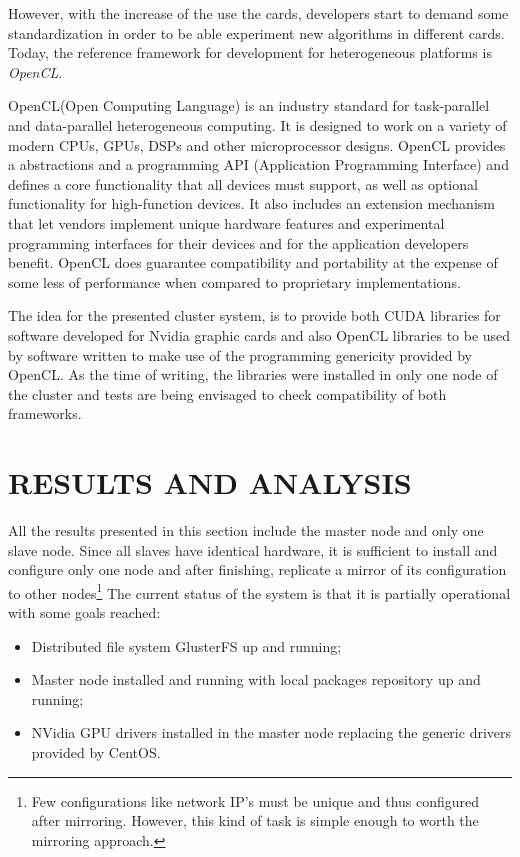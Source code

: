 \documentclass[twoside,a4paper,12pt,english]{inac17}
\begin{document}
However, with the increase of the use the cards, developers start to demand some
standardization in order to be able experiment new algorithms in different cards. Today, the
reference framework for development for heterogeneous platforms is \textit{OpenCL}\cite{opencl}.

OpenCL\texttrademark (Open Computing Language) is an industry standard for task-parallel and
data-parallel heterogeneous computing. It is designed to work on a variety of modern
CPUs, GPUs, DSPs and other microprocessor designs. OpenCL provides a abstractions and a
programming API (Application Programming Interface) and defines a core functionality that all
devices must support, as well as optional functionality for high-function devices. It also
includes an extension mechanism that let vendors implement unique hardware features and
experimental programming interfaces for their devices and for the application developers
benefit. OpenCL does guarantee compatibility and portability at the expense of some less
of performance when compared to proprietary implementations.

The idea for the presented cluster system, is to provide both CUDA libraries for
software developed for Nvidia graphic cards and also OpenCL libraries to
be used by software written to make use of the programming genericity
provided by OpenCL. As the time of writing, the libraries were installed
in only one node of the cluster and tests are being envisaged to check
compatibility of both frameworks.


\section{RESULTS AND ANALYSIS}

All the results presented in this section include the master node and only one slave node.
Since all slaves have identical hardware, it is sufficient to install and configure only one
node and after finishing, replicate a mirror of its configuration to other nodes\footnote{Few configurations like
  network IP's must be unique and thus configured after mirroring. However, this kind of task is simple enough to worth the mirroring approach.}
The current status of the system is that it is partially operational with some goals reached:

\begin{itemize}

\item Distributed file system GlusterFS up and running;
\item Master node installed and running with local packages repository up and running;
\item NVidia GPU drivers installed in the master node replacing the generic drivers provided by CentOS.
  
\end{itemize}
\end{document}
